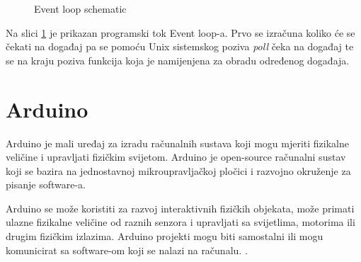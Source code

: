 \begin{figure}[H]
\centering
{}
\caption{Event loop schematic}
\label{fig:event_loop}
\end{figure}

Na slici \ref{fig:event_loop} je prikazan programski tok Event loop-a. Prvo se
izračuna koliko će se čekati na događaj pa se pomoću Unix sistemskog poziva
\emph{poll} čeka na događaj te se na kraju poziva funkcija koja je namijenjena za
obradu određenog događaja.

\newpage
\section{Arduino}

Arduino je mali uređaj za izradu računalnih sustava koji mogu mjeriti fizikalne
veličine i upravljati fizičkim svijetom. Arduino je open-source računalni sustav
koji se bazira na jednostavnoj mikroupravljačkoj pločici i razvojno okruženje za
pisanje software-a.

Arduino se može koristiti za razvoj interaktivnih fizičkih objekata, može
primati ulazne fizikalne veličine od raznih senzora i upravljati sa svijetlima,
motorima ili drugim fizičkim izlazima. Arduino projekti mogu biti samostalni ili
mogu komunicirat sa software-om koji se nalazi na računalu.
\cite{arduino_intro}.

